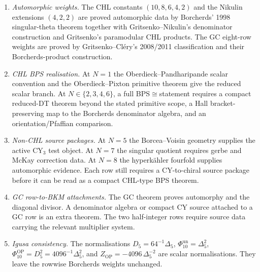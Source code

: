 \begin{enumerate}
\item \emph{Automorphic weights.}  The CHL constants
$(10,8,6,4,2)$ and the Nikulin extensions $(4,2,2)$ are proved
automorphic data by Borcherds' 1998 singular-theta theorem together
with Gritsenko--Nikulin's denominator construction and Gritsenko's
paramodular CHL products.  The GC eight-row weights are proved by
Gritsenko--Cl\'ery's 2008/2011 classification and their Borcherds-product
construction.
\item \emph{CHL BPS realisation.}  At $N=1$ the
Oberdieck--Pandharipande scalar convention and the Oberdieck--Pixton
primitive theorem give the reduced scalar branch.  At
$N\in\{2,3,4,6\}$, a full BPS$\cong$\BKM statement requires a compact
reduced-DT theorem beyond the stated primitive scope, a Hall
bracket-preserving map to the Borcherds denominator algebra, and an
orientation/Pfaffian comparison.
\item \emph{Non-CHL source packages.}  At $N=5$ the Borcea--Voisin
geometry supplies the active CY$_3$ test object.  At $N=7$ the singular
quotient requires gerbe and McKay correction data.  At $N=8$ the
hyperk\"ahler fourfold supplies automorphic evidence.  Each row still
requires a CY-to-chiral source package before it can be read as a
compact CHL-type BPS theorem.
\item \emph{GC row-to-BKM attachments.}  The GC theorem proves
automorphy and the diagonal divisor.  A denominator algebra or compact
CY source attached to a GC row is an extra theorem.  The two
half-integer rows require source data carrying the relevant multiplier
system.
\item \emph{Igusa consistency.}  The normalisations
$D_5=64^{-1}\Delta_5$, $\Phi_{10}^{\mathrm{un}}=\Delta_5^2$,
$\Phi_{10}^{\mathrm{OP}}=D_5^2=4096^{-1}\Delta_5^2$, and
$Z_{\mathrm{OP}}=-4096\,\Delta_5^{-2}$ are scalar normalisations.  They
leave the rowwise Borcherds weights unchanged.
\end{enumerate}
